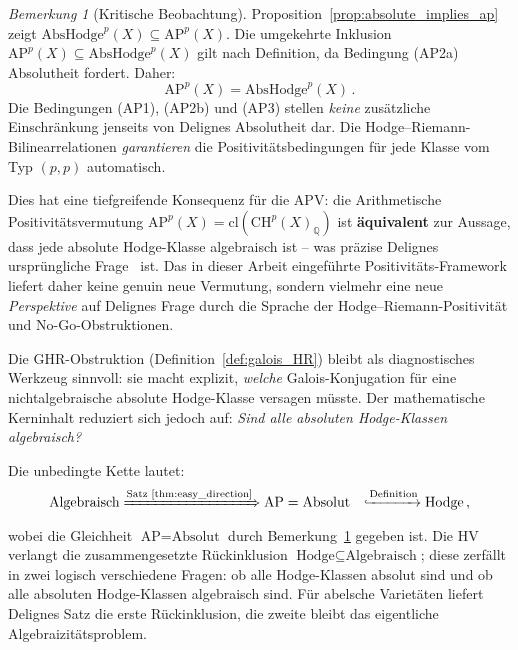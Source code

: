 \documentclass[aps,prd,twocolumn,superscriptaddress,nofootinbib]{revtex4-2}
\theoremstyle{definition}
\theoremstyle{remark}
\newtheorem{remark}[theorem]{Bemerkung}
\def\\{ }%
\begin{document}
\begin{remark}[Kritische Beobachtung]
\label{rem:ap_equals_absolute}
Proposition~\ref{prop:absolute_implies_ap} zeigt $\mathrm{AbsHodge}^p(X) \subseteq \mathrm{AP}^p(X)$. Die umgekehrte Inklusion $\mathrm{AP}^p(X) \subseteq \mathrm{AbsHodge}^p(X)$ gilt nach Definition, da Bedingung (AP2a) Absolutheit fordert. Daher:
\begin{equation}
\mathrm{AP}^p(X) = \mathrm{AbsHodge}^p(X)\,.
\end{equation}
Die Bedingungen (AP1), (AP2b) und (AP3) stellen \textit{keine} zusätzliche Einschränkung jenseits von Delignes Absolutheit dar. Die Hodge--Riemann-Bilinearrelationen \textit{garantieren} die Positivitätsbedingungen für jede Klasse vom Typ $(p,p)$ automatisch.

Dies hat eine tiefgreifende Konsequenz für die APV: die Arithmetische Positivitätsvermutung $\mathrm{AP}^p(X) = \mathrm{cl}(\mathrm{CH}^p(X)_\mathbb{Q})$ ist \textbf{äquivalent} zur Aussage, dass jede absolute Hodge-Klasse algebraisch ist -- was präzise Delignes ursprüngliche Frage~\cite{Deligne1982} ist. Das in dieser Arbeit eingeführte Positivitäts-Framework liefert daher keine genuin neue Vermutung, sondern vielmehr eine neue \textit{Perspektive} auf Delignes Frage durch die Sprache der Hodge--Riemann-Positivität und No-Go-Obstruktionen.

Die GHR-Obstruktion (Definition~\ref{def:galois_HR}) bleibt als diagnostisches Werkzeug sinnvoll: sie macht explizit, \textit{welche} Galois-Konjugation für eine nichtalgebraische absolute Hodge-Klasse versagen müsste. Der mathematische Kerninhalt reduziert sich jedoch auf: \textit{Sind alle absoluten Hodge-Klassen algebraisch?}
\end{remark}

Die unbedingte Kette lautet:
\begin{equation}
\begin{aligned}
\text{Algebraisch}
&\xRightarrow{\text{Satz~\ref{thm:easy_direction}}}
  \text{AP} = \text{Absolut}\\
&\xhookrightarrow{\text{Definition}} \text{Hodge}\,,
\end{aligned}
\end{equation}
wobei die Gleichheit $\text{AP} = \text{Absolut}$ durch Bemerkung~\ref{rem:ap_equals_absolute} gegeben ist. Die HV verlangt die zusammengesetzte Rückinklusion $\text{Hodge}\subseteq\text{Algebraisch}$; diese zerfällt in zwei logisch verschiedene Fragen: ob alle Hodge-Klassen absolut sind und ob alle absoluten Hodge-Klassen algebraisch sind. Für abelsche Varietäten liefert Delignes Satz die erste Rückinklusion, die zweite bleibt das eigentliche Algebraizitätsproblem.
\end{document}
